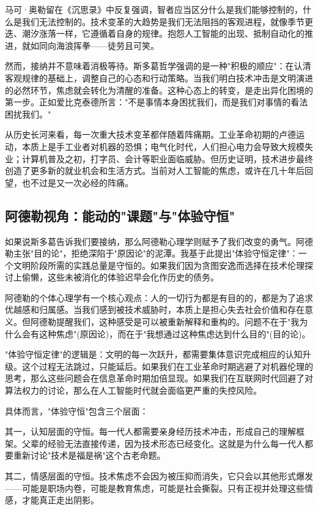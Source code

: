 \documentclass[a4paper,12pt]{ctexart}
\begin{document}
马可·奥勒留在《沉思录》中反复强调，智者应当区分什么是我们能够控制的，什么是我们无法控制的。技术变革的大趋势是我们无法阻挡的客观进程，就像季节更迭、潮汐涨落一样，它遵循着自身的规律。抱怨人工智能的出现、抵制自动化的推进，就如同向海浪挥拳——徒劳且可笑。

然而，接纳并不意味着消极等待。斯多葛哲学强调的是一种"积极的顺应"：在认清客观规律的基础上，调整自己的心态和行动策略。当我们明白技术冲击是文明演进的必然环节，焦虑就会转化为清醒的准备。这种心态上的转变，是走出异化困境的第一步。正如爱比克泰德所言："不是事情本身困扰我们，而是我们对事情的看法困扰我们。"

从历史长河来看，每一次重大技术变革都伴随着阵痛期。工业革命初期的卢德运动，本质上是手工业者对机器的恐惧；电气化时代，人们担心电力会导致大规模失业；计算机普及之初，打字员、会计等职业面临威胁。但历史证明，技术进步最终创造了更多新的就业机会和生活方式。当前对人工智能的焦虑，或许在几十年后回望，也不过是又一次必经的阵痛。

\subsection{阿德勒视角：能动的"课题"与"体验守恒"}

如果说斯多葛告诉我们要接纳，那么阿德勒心理学则赋予了我们改变的勇气。阿德勒主张"目的论"，拒绝深陷于"原因论"的泥潭。我基于此提出"体验守恒定律"：一个文明阶段所需的实践总量是守恒的。如果我们因为贪图安逸而选择在技术伦理探讨上偷懒，这些未被消化的体验迟早会化作历史的债务。

阿德勒的个体心理学有一个核心观点：人的一切行为都是有目的的，都是为了追求优越感和归属感。当我们感到被技术威胁时，本质上是担心失去社会价值和存在意义。但阿德勒提醒我们，这种感受是可以被重新解释和重构的。问题不在于"我为什么会有这种焦虑"(原因论)，而在于"我想通过这种焦虑达到什么目的"(目的论)。

"体验守恒定律"的逻辑是：文明的每一次跃升，都需要集体意识完成相应的认知升级。这个过程无法跳过，只能延后。如果我们在工业革命时期逃避了对机器伦理的思考，那么这些问题会在信息革命时期加倍显现。如果我们在互联网时代回避了对算法权力的讨论，那么在人工智能时代就会面临更严重的失控风险。

具体而言，"体验守恒"包含三个层面：

其一，认知层面的守恒。每一代人都需要亲身经历技术冲击，形成自己的理解框架。父辈的经验无法直接传递，因为技术形态已经变化。这就是为什么每一代人都要重新讨论"技术是福是祸"这个古老命题。

其二，情感层面的守恒。技术焦虑不会因为被压抑而消失，它只会以其他形式爆发——可能是职场内卷，可能是教育焦虑，可能是社会撕裂。只有正视并处理这些情感，才能真正走出阴影。
\end{document}
